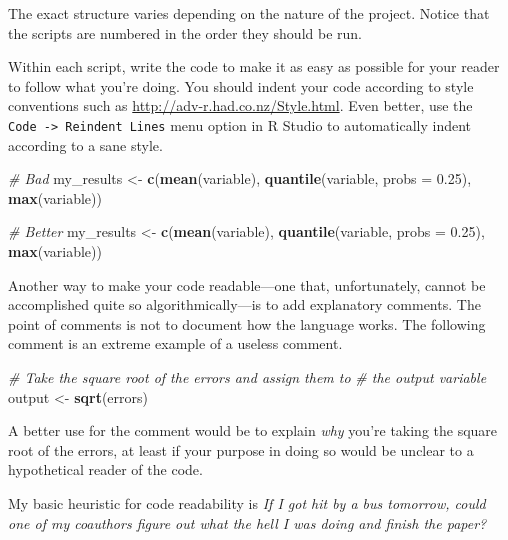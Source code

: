 \documentclass[12pt,oneside,openany]{book}
\newenvironment{Shaded}{\begin{snugshade}}{\end{snugshade}}
\newcommand{\KeywordTok}[1]{\textcolor[rgb]{0.13,0.29,0.53}{\textbf{{#1}}}}
\newcommand{\DataTypeTok}[1]{\textcolor[rgb]{0.13,0.29,0.53}{{#1}}}
\newcommand{\FloatTok}[1]{\textcolor[rgb]{0.00,0.00,0.81}{{#1}}}
\newcommand{\StringTok}[1]{\textcolor[rgb]{0.31,0.60,0.02}{{#1}}}
\newcommand{\CommentTok}[1]{\textcolor[rgb]{0.56,0.35,0.01}{\textit{{#1}}}}
\newcommand{\NormalTok}[1]{{#1}}
\begin{document}
The exact structure varies depending on the nature of the project.
Notice that the scripts are numbered in the order they should be run.

Within each script, write the code to make it as easy as possible for
your reader to follow what you're doing. You should indent your code
according to style conventions such as
\url{http://adv-r.had.co.nz/Style.html}. Even better, use the
\texttt{Code\ -\textgreater{}\ Reindent\ Lines} menu option in R Studio
to automatically indent according to a sane style.

\begin{Shaded}
\begin{Highlighting}[]
\CommentTok{# Bad}
\NormalTok{my_results <-}\StringTok{ }\KeywordTok{c}\NormalTok{(}\KeywordTok{mean}\NormalTok{(variable),}
\KeywordTok{quantile}\NormalTok{(variable,}
\DataTypeTok{probs =} \FloatTok{0.25}\NormalTok{),}
\KeywordTok{max}\NormalTok{(variable))}

\CommentTok{# Better}
\NormalTok{my_results <-}\StringTok{ }\KeywordTok{c}\NormalTok{(}\KeywordTok{mean}\NormalTok{(variable),}
                \KeywordTok{quantile}\NormalTok{(variable,}
                         \DataTypeTok{probs =} \FloatTok{0.25}\NormalTok{),}
                \KeywordTok{max}\NormalTok{(variable))}
\end{Highlighting}
\end{Shaded}

Another way to make your code readable---one that, unfortunately, cannot
be accomplished quite so algorithmically---is to add explanatory
comments. The point of comments is not to document how the language
works. The following comment is an extreme example of a useless comment.

\begin{Shaded}
\begin{Highlighting}[]
\CommentTok{# Take the square root of the errors and assign them to}
\CommentTok{# the output variable}
\NormalTok{output <-}\StringTok{ }\KeywordTok{sqrt}\NormalTok{(errors)}
\end{Highlighting}
\end{Shaded}

A better use for the comment would be to explain \emph{why} you're
taking the square root of the errors, at least if your purpose in doing
so would be unclear to a hypothetical reader of the code.

My basic heuristic for code readability is \emph{If I got hit by a bus
tomorrow, could one of my coauthors figure out what the hell I was doing
and finish the paper?}
\end{document}
